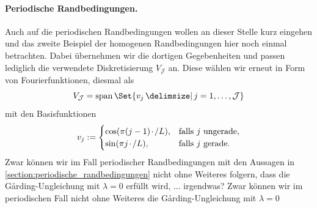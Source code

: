 \documentclass[../main.tex]{subfiles}
\begin{document}
\paragraph{Periodische Randbedingungen.} %
\label{par:periodische_randbedingungen_}

Auch auf die periodischen Randbedingungen wollen an dieser Stelle kurz eingehen und das zweite Beispiel der homogenen Randbedingungen hier noch einmal betrachten.
Dabei übernehmen wir die dortigen Gegebenheiten und passen lediglich die verwendete Diskretisierung $V_{\mathcal J}$ an.
Diese wählen wir erneut in Form von Fourierfunktionen, diesmal als
\begin{equation}
    V_{\mathcal J} = \spn \Set{ v_{j} \given j = 1, \dots, \mathcal J}
\end{equation}
mit den Basisfunktionen
\begin{equation}
    v_{j} := \begin{cases}
        \cos(\pi (j - 1) {\mkern2mu\cdot\mkern2mu} / L), & \text{falls } j \text{ ungerade},\\
        \sin(\pi j {\mkern2mu\cdot\mkern2mu} / L), & \text{falls } j \text{ gerade}.
    \end{cases}
\end{equation}
Zwar können wir im Fall periodischer Randbedingungen mit den Aussagen in \cref{section:periodische_randbedingungen} nicht ohne Weiteres folgern, dass die G\aa{}rding-Ungleichung mit $\lambda = 0$ erfüllt wird, ... irgendwas?
Zwar können wir im periodischen Fall nicht ohne Weiteres die G\aa{}rding-Ungleichung mit $\lambda = 0$
\end{document}
